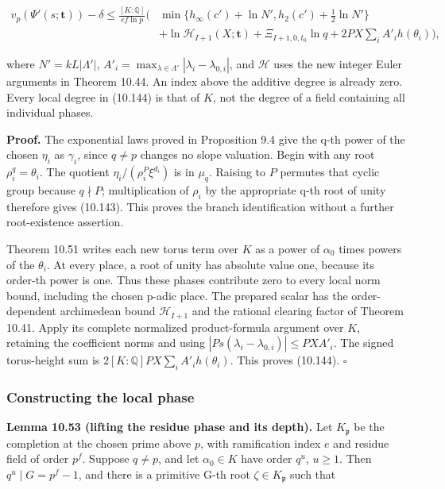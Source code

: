 \documentclass[
  11pt,
  a4paper,
]{article}
\begin{document}
\[
\begin{aligned}
v_p(\Psi'(s;\boldsymbol t))-\delta
\le\frac{[K:\mathbb Q]}{ef\ln p}\biggl(&
\min\{h_\infty(c')+\ln N',h_2(c')+\tfrac12\ln N'\}\\
&+\ln\mathcal H_{I+1}(X;\boldsymbol t)
+\Xi_{I+1,0,t_0}\ln q
+2PX\sum_i A'_i h(\theta_i)\biggr),
\end{aligned}
\tag{10.144}
\]

where \(N'=kL|\Lambda'|\),
\(A'_i=\max_{\lambda\in\Lambda'}|\lambda_i-\lambda_{0,i}|\), and
\(\mathcal H\) uses the new integer Euler arguments in Theorem 10.44. An
index above the additive degree is already zero. Every local degree in
(10.144) is that of \(K\), not the degree of a field containing all
individual phases.

\textbf{Proof.} The exponential laws proved in Proposition 9.4 give the
q-th power of the chosen \(\eta_i\) as \(\gamma_i\), since \(q\ne p\)
changes no slope valuation. Begin with any root \(\rho_i^q=\theta_i\).
The quotient \(\eta_i/(\rho_i^P\xi^{d_i})\) is in \(\mu_q\). Raising to
\(P\) permutes that cyclic group because \(q\nmid P\); multiplication of
\(\rho_i\) by the appropriate q-th root of unity therefore gives
(10.143). This proves the branch identification without a further
root-existence assertion.

Theorem 10.51 writes each new torus term over \(K\) as a power of
\(\alpha_0\) times powers of the \(\theta_i\). At every place, a root of
unity has absolute value one, because its order-th power is one. Thus
these phases contribute zero to every local norm bound, including the
chosen p-adic place. The prepared scalar has the order-dependent
archimedean bound \(\mathcal H_{I+1}\) and the rational clearing factor
of Theorem 10.41. Apply its complete normalized product-formula argument
over \(K\), retaining the coefficient norms and using
\(|Ps(\lambda_i-\lambda_{0,i})|\le PX A'_i\). The signed torus-height
sum is \(2[K:\mathbb Q]PX\sum_i A'_ih(\theta_i)\). This proves (10.144).
\(\square\)

\subsubsection{Constructing the local
phase}\label{constructing-the-local-phase}

\textbf{Lemma 10.53 (lifting the residue phase and its depth).} Let
\(K_{\mathfrak p}\) be the completion at the chosen prime above \(p\),
with ramification index \(e\) and residue field of order \(p^f\).
Suppose \(q\ne p\), and let \(\alpha_0\in K\) have order \(q^u\),
\(u\ge1\). Then \(q^u\mid G=p^f-1\), and there is a primitive G-th root
\(\zeta\in K_{\mathfrak p}\) such that
\end{document}
